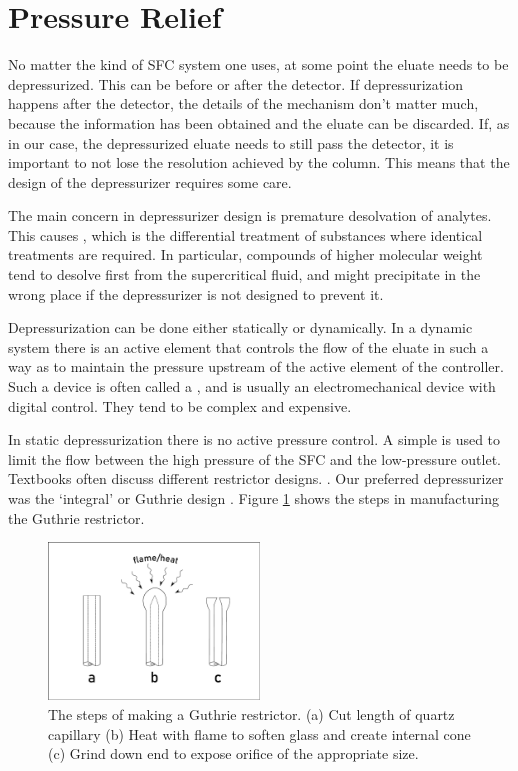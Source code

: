 \section{Pressure Relief}
\label{sec:Restrictor}

No matter the kind of SFC system one uses, at some point the eluate needs to be
depressurized. This can be before or after the detector. If depressurization
happens after the detector, the details of the mechanism don't matter much,
because the information has been obtained and the eluate can be discarded.
If, as in our case, the depressurized eluate needs to still pass the detector,
it is important to not lose the resolution achieved by the column. This means
that the design of the depressurizer requires some care.

The main concern in depressurizer design is premature desolvation of analytes.
This causes , which is the differential treatment of
substances where identical treatments are required. In particular, compounds of
higher molecular weight tend to desolve first from the supercritical fluid, and
might precipitate in the wrong place if the depressurizer is not designed to
prevent it. 

Depressurization can be done either statically or dynamically. In a dynamic
system there is an active element that controls the flow of the eluate in such a
way as to maintain the pressure upstream of the active element of the
controller. Such a device is often called a ,
and is usually an electromechanical device with digital control. They tend to
be complex and expensive.

In static depressurization there is no active pressure control. A simple
 is used to limit the flow between the high pressure of the
SFC and the low-pressure outlet. Textbooks often discuss different restrictor
designs. \autocite[The book by][provides an example.]{LuquedeCastro1994}. Our
preferred depressurizer was the `integral' or Guthrie design
\autocite{Guthrie1986}. Figure \ref{fig:restrictor} shows the steps in
manufacturing the Guthrie restrictor.

\begin{figure}
\centering
\includegraphics[width=0.5\textwidth]{Figures/Restrictor.pdf}
\decoRule

\caption[A diagram of a integral restrictor.]{The steps of making a Guthrie restrictor. (a) Cut
length of quartz capillary (b) Heat with flame to soften glass and create
internal cone (c) Grind down end to expose orifice of the appropriate size.}

\label{fig:restrictor}
\end{figure}

